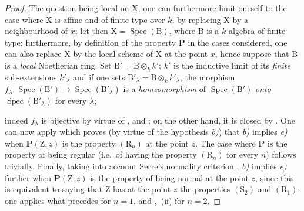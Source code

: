 \begin{proof}
The question being local on $\mathrm{X}$, one can furthermore limit oneself to the case where $\mathrm{X}$ is affine and of finite type over $k$, by replacing $\mathrm{X}$ by a neighbourhood of $x$; let then $\mathrm{X}=\operatorname{Spec}(\mathrm{B})$, where $\mathrm{B}$ is a $k$-algebra of finite type; furthermore, by definition of the property $\boldsymbol{P}$ in the cases considered, one can also replace $\mathrm{X}$ by the local scheme of $\mathrm{X}$ at the point $x$, hence suppose that $\mathrm{B}$ is a \emph{local} Noetherian ring. Set $\mathrm{B}'=\mathrm{B}\otimes_k k'$; $k'$ is the inductive limit of its \emph{finite} sub-extensions $k'_\lambda$ and if one sets $\mathrm{B}'_\lambda=\mathrm{B}\otimes_k k'_\lambda$, the morphism $f_\lambda:\operatorname{Spec}(\mathrm{B}')\to\operatorname{Spec}(\mathrm{B}'_\lambda)$ is a \emph{homeomorphism} of $\operatorname{Spec}(\mathrm{B}')$ \emph{onto} $\operatorname{Spec}(\mathrm{B}'_\lambda)$ for every $\lambda$;


indeed $f_\lambda$ is bijective by virtue of ,  and ; on the other hand, it is closed by . One can now apply  which proves (by virtue of the hypothesis \emph{b)}) that \emph{b)} implies \emph{e)} when $\boldsymbol{P}(\mathrm{Z},z)$ is the property $(\mathrm{R}_n)$ at the point $z$. The case where $\boldsymbol{P}$ is the property of being regular (i.e.\ of having the property $(\mathrm{R}_n)$ for every $n$) follows trivially. Finally, taking into account Serre's normality criterion , \emph{b)} implies \emph{e)} further when $\boldsymbol{P}(\mathrm{Z},z)$ is the property of being normal at the point $z$, since this is equivalent to saying that $\mathrm{Z}$ has at the point $z$ the properties $(\mathrm{S}_2)$ and $(\mathrm{R}_1)$: one applies what precedes for $n=1$, and ,~(ii) for $n=2$.
\end{proof}

